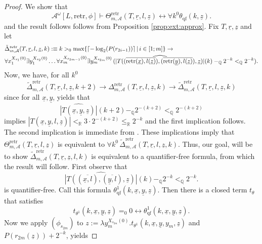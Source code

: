 \documentclass[11pt]{amsart}
\theoremstyle{definition}
\theoremstyle{remark}
\DeclarePairedDelimiter{\ceil}{\lceil}{\rceil}
\def\QQ{\mathbb{Q}}
\def\RR{\mathbb{R}}
\begin{document}
\begin{proof}
We show that
\[
\mathcal{A}^\omega[L,\mathrm{retr},\phi]\vdash \Theta^\mathrm{retr}_{m,\mathcal{A}}(T,\underline{r},l,\underline{z}) \leftrightarrow \forall k^0\theta_\mathrm{qf}(k,\underline{z}).
\]
and the result follows follows from Proposition \ref{prop:ext:approx}. Fix $T,\underline{r},\underline{z}$ and let 
    \begin{align*}
          &\tilde{\Delta}^\mathrm{retr}_{m,\mathcal{A}}(T,\underline{r},l,\underline{z},k):\equiv k>_0\max\{\ceil{-\log_2(P(r_{2i-1}))}\,|\, i \in [1;m]\} \to\\ &\forall x_1^{X_{s_1}(0)} \exists y_1^{X_{s_2}(0)} \ldots \forall x_m^{X_{s_{2m-1}}(0)}\exists y_m^{X_{s_{2m}}(0)}
\,(\widehat{|T((\overline{\mathrm{retr}(\underline{x}),l(\underline{z})}),(\overline{\mathrm{retr}(\underline{y}),l(\underline{z})}),\underline{z})|}(k) -_\QQ 2^{-k}<_\QQ 2^{-k}).
    \end{align*} 
Now, we have, for all $k^0$
\[
\tilde{\Delta}^\mathrm{retr}_{m,\mathcal{A}}(T,\underline{r},l,\underline{z},k+2) \to \Delta^\mathrm{retr}_{m,\mathcal{A}}(T,\underline{r},l,\underline{z},k) \to \tilde{\Delta}^\mathrm{retr}_{m,\mathcal{A}}(T,\underline{r},l,\underline{z},k)\tag{$\dagger$}
\]
since for all $\underline{x},\underline{y}$, \cite[Lemma 4.2]{Kohlenbach2008} yields that 
\[
\widehat{|T(\underline{x},\underline{y},\underline{z})|}(k+2) -_\QQ 2^{-(k+2)}<_\QQ 2^{-(k+2)}
\]
implies  $|T(\underline{x},\underline{y},l,\underline{z})|<_\RR  3 \cdot 2^{-(k+2)}\le _\RR 2^{-k}$ and the first implication follows. The second implication is immediate from \cite[Lemma 4.2]{Kohlenbach2008}. These implications imply that $\Theta^{\mathrm{retr}}_{m,\mathcal{A}}(T,\underline{r},l,\underline{z})$ is equivalent to $\forall k^0\,\tilde{\Delta}^\mathrm{retr}_{m,\mathcal{A}}(T,\underline{r},l,\underline{z},k)$. Thus, our goal, will be to show $\tilde{\Delta}^\mathrm{retr}_{m,\mathcal{A}}(T,\underline{r},\underline{z},l,k)$ is equivalent to a quantifier-free formula, from which the result will follow. First observe that 
\[
\widehat{|T((\overline{\underline{x},l}),(\overline{\underline{y},l}),\underline{z})|}(k) -_\QQ 2^{-k}<_\QQ 2^{-k}.
\]
is quantifier-free. Call this formula $\theta^1_{\mathrm{qf}}(k,\underline{x},\underline{y},\underline{z})$.  Then there is a closed term $t_\theta$ that satisfies
\[
t_{\theta^1}(k,\underline{x},\underline{y},\underline{z})=_0 0 \leftrightarrow \theta^1_{\mathrm{qf}}(k,\underline{x},\underline{y},\underline{z}). 
\]
Now we apply $(\phi_{s_{2m}})$ to $z := \lambda y_m^{X_{s_{2m}}(0)}. t_{\theta^1}(k,\underline{x},\underline{y},y_m,\underline{z})$ and $P(r_{2m}(\underline{z}))+2^{-k}$, yields

\end{proof}
\end{document}
